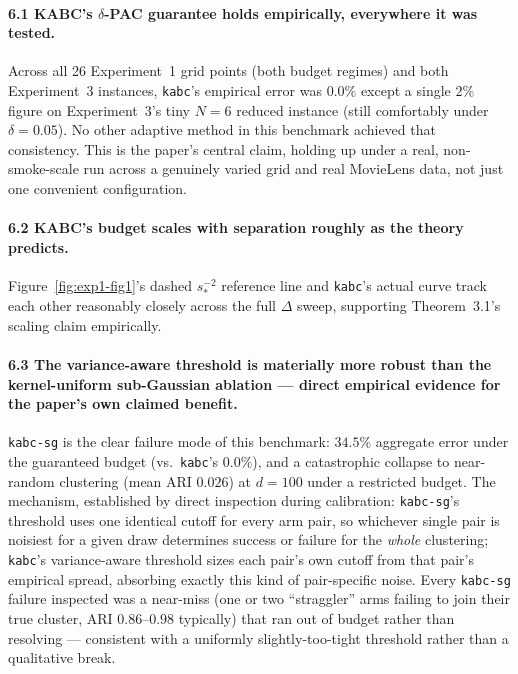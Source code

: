 \documentclass[11pt]{article}
\begin{document}
\paragraph{6.1 KABC's $\delta$-PAC guarantee holds empirically, everywhere it was tested.}
Across all 26 Experiment~1 grid points (both budget regimes) and both
Experiment~3 instances, \texttt{kabc}'s empirical error was $0.0\%$ except a
single $2\%$ figure on Experiment~3's tiny $N=6$ reduced instance (still
comfortably under $\delta=0.05$). No other adaptive method in this benchmark
achieved that consistency. This is the paper's central claim, holding up
under a real, non-smoke-scale run across a genuinely varied grid and real
MovieLens data, not just one convenient configuration.

\paragraph{6.2 KABC's budget scales with separation roughly as the theory predicts.}
Figure~\ref{fig:exp1-fig1}'s dashed $s_*^{-2}$ reference line and \texttt{kabc}'s
actual curve track each other reasonably closely across the full $\Delta$
sweep, supporting Theorem~3.1's scaling claim empirically.

\paragraph{6.3 The variance-aware threshold is materially more robust than the
kernel-uniform sub-Gaussian ablation --- direct empirical evidence for the
paper's own claimed benefit.}
\texttt{kabc-sg} is the clear failure mode of this benchmark: $34.5\%$ aggregate
error under the guaranteed budget (vs.\ \texttt{kabc}'s $0.0\%$), and a
catastrophic collapse to near-random clustering (mean ARI $0.026$) at $d=100$
under a restricted budget. The mechanism, established by direct inspection
during calibration: \texttt{kabc-sg}'s threshold uses one identical cutoff for
every arm pair, so whichever single pair is noisiest for a given draw
determines success or failure for the \emph{whole} clustering; \texttt{kabc}'s
variance-aware threshold sizes each pair's own cutoff from that pair's
empirical spread, absorbing exactly this kind of pair-specific noise. Every
\texttt{kabc-sg} failure inspected was a near-miss (one or two ``straggler''
arms failing to join their true cluster, ARI $0.86$--$0.98$ typically) that ran
out of budget rather than resolving --- consistent with a uniformly
slightly-too-tight threshold rather than a qualitative break.
\end{document}
